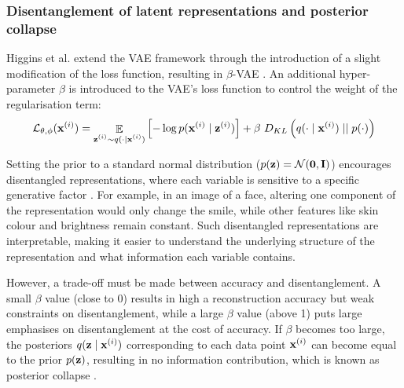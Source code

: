 \subsubsection{Disentanglement of latent representations and posterior collapse} \label{cha:disentang}
	Higgins et al. extend the VAE framework through the introduction of a slight modification of the loss function, resulting in $\beta$-VAE \citep{higginsBetaVAELearningBasic2022}. An additional hyper-parameter $\beta$ is introduced to the VAE's loss function to control the weight of the regularisation term:
	$$
	\mathcal{L}_{\theta, \phi} (\mathbf{x}^{(i)}) = \mathop{\mathbb{E}}_{\substack{\mathbf{z}^{(i)} \sim q (\cdot \mid \mathbf{x}^{(i)})}} \left[ -\log p (\mathbf{x}^{(i)} \mid \mathbf{z}^{(i)}) \right] + \beta~ D_{KL} \left(  q (\cdot \mid \mathbf{x}^{(i)})  \mid \mid  p(\cdot)  \right)
	$$
	
	Setting the prior to a standard normal distribution ($p(\mathbf{z}) = \mathcal{N}(\bm{\mathbf{0}}, \mathbf{I})$) encourages disentangled representations, where each variable is sensitive to a specific generative factor \citep{higginsBetaVAELearningBasic2022, bengioRepresentationLearningReview2013}. For example, in an image of a face, altering one component of the representation would only change the smile, while other features like skin colour and brightness remain constant. Such disentangled representations are interpretable, making it easier to understand the underlying structure of the representation and what information each variable contains.
	
	However, a trade-off must be made between accuracy and disentanglement. A small $\beta$ value (close to 0) results in high a reconstruction accuracy but weak constraints on disentanglement, while a large $\beta$ value (above 1) puts large emphasises on disentanglement at the cost of accuracy. If $\beta$ becomes too large, the posteriors $q (\mathbf{z} \mid \mathbf{x}^{(i)})$ corresponding to each data point $\mathbf{x}^{(i)}$ can become equal to the prior $p(\mathbf{z})$, resulting in no information contribution, which is known as posterior collapse \citep{lucasUnderstandingPosteriorCollapse2022}.
	

	
	
	

%
%
	
